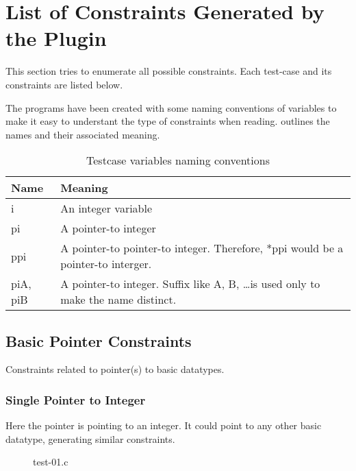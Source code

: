 \section{List of Constraints Generated by the Plugin}\label{sec:constraints}
This section tries to enumerate all possible constraints. Each test-case and its constraints are listed below.

The programs have been created with some naming conventions of variables to make it easy to understant the type of constraints when reading.  outlines the names and their associated meaning.

\begin{table}
\begin{center}
    \begin{tabular}{| m{2cm} | m{7cm} |}
    \hline
    \textbf{Name} & \textbf{Meaning} \\
    \hline
    \hline
    i & An integer variable \\
    \hline
    pi & A pointer-to integer \\
    \hline
    ppi & A pointer-to pointer-to integer. Therefore, *ppi would be a pointer-to interger. \\
    \hline
    piA, piB & A pointer-to integer. Suffix like A, B, \ldots is used only to make the name distinct. \\
    \hline
    \end{tabular}
    \caption{Testcase variables naming conventions}
    \label{table:varname}
\end{center}
\end{table}

\subsection{Basic Pointer Constraints}
Constraints related to pointer(s) to basic datatypes.
\subsubsection{Single Pointer to Integer} Here the pointer is pointing to an integer. It could point to any other basic datatype, generating similar constraints.

\begin{figure}
\label{fig:test-01}

\caption{test-01.c}
\end{figure}

